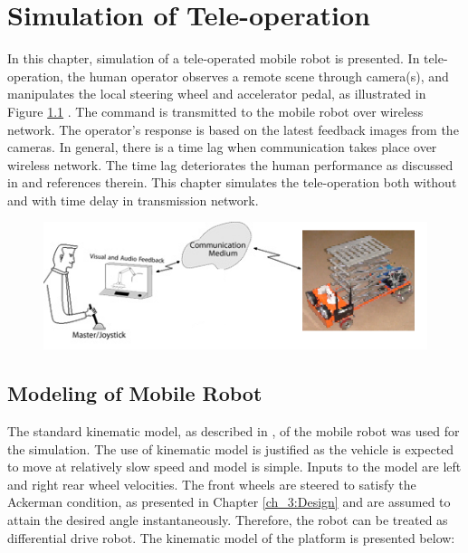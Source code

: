 
\chapter{Simulation of Tele-operation}
\label{c6_simulation}
In this chapter, simulation of a tele-operated mobile robot is presented. In tele-operation, the human operator observes a remote scene through camera(s), and manipulates the local steering wheel and accelerator pedal, as illustrated in Figure \ref{fig:teleoperation} . The command is transmitted to the mobile robot over wireless network. The operator's response is based on the latest feedback images from the cameras. In general, there is a time lag when communication takes place over wireless network. The time lag deteriorates the human performance as discussed in \cite{chen2007human} and references therein.  This chapter simulates the tele-operation both without and with time delay in transmission network.
\begin{figure}
	\includegraphics[width=\linewidth,keepaspectratio]{Chapter6/fig/teleoperation}
	\label{fig:teleoperation} 
\end{figure}

\section{Modeling of Mobile Robot}
The standard kinematic model, as described in \cite{campion1996structural}, of the mobile robot was used for the simulation. The use of kinematic model is justified as  the vehicle is expected to move at relatively slow speed and model is simple. Inputs to the model are left and right rear wheel velocities. The front wheels are steered to satisfy the Ackerman condition, as presented in Chapter \ref{ch_3:Design}  and are assumed to attain the desired angle instantaneously. Therefore, the robot can be treated as differential drive robot.  The kinematic model of the platform is presented below:


